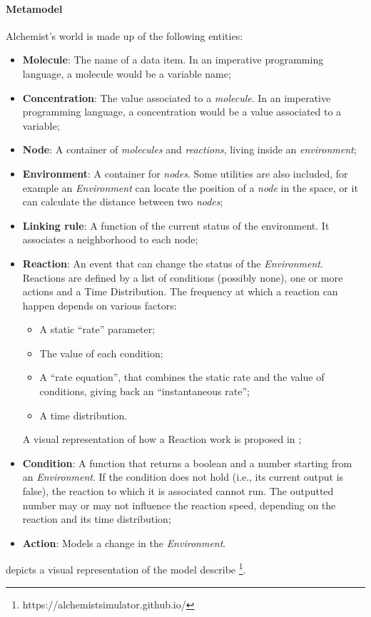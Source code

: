 \paragraph{Metamodel} Alchemist's world is made up of the following entities:
\begin{itemize}
	\item \textbf{Molecule}: The name of a data item. In an imperative programming language, a molecule would be a variable name;
	\item \textbf{Concentration}: The value associated to a \textit{molecule}. In an imperative programming language, a concentration would be a value associated to a variable;
	\item \textbf{Node}: A container of \textit{molecules} and \textit{reactions}, living inside an \textit{environment};
	\item \textbf{Environment}: A container for \textit{nodes}. Some utilities are also included, for example an \textit{Environment} can locate the position of a \textit{node} in the space, or it can calculate the distance between two \textit{nodes};
	\item \textbf{Linking rule}: A function of the current status of the environment. It associates a neighborhood to each node;
	\item \textbf{Reaction}: An event that can change the status of the \textit{Environment}. Reactions are defined by a list of conditions (possibly none), one or more actions and  a Time Distribution. The frequency at which a reaction can happen depends on various factors:
	\begin{itemize}
		\item A static “rate” parameter;
		\item The value of each condition;
		\item A “rate equation”, that combines the static rate and the value of conditions, giving back an “instantaneous rate”;
		\item A time distribution.
	\end{itemize}
	A visual representation of how a Reaction work is proposed in ;
	\item \textbf{Condition}: A function that returns a boolean and a number starting from an \textit{Environment}. If the condition does not hold (i.e., its current output is false), the reaction to which it is associated cannot run.
	The outputted number may or may not influence the reaction speed, depending on the reaction and its time distribution;
	\item \textbf{Action}: Models a change in the \textit{Environment}.
\end{itemize}
 depicts a visual representation of the model describe  \footnote{https://alchemistsimulator.github.io/}.

